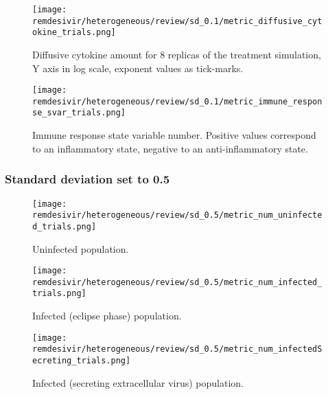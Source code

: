 \begin{figure}[H]
\texttt{[image: remdesivir/heterogeneous/review/sd\_0.1/metric\_diffusive\_cytokine\_trials.png]}
\caption{Diffusive cytokine amount for 8 replicas of the treatment simulation, Y axis in log scale, exponent values as tick-marks.\label{fig:app:hetero_other_sd:0.1:diff_cyto}}
\end{figure}


\begin{figure}[H]
\texttt{[image: remdesivir/heterogeneous/review/sd\_0.1/metric\_immune\_response\_svar\_trials.png]}
\caption{Immune response state variable number. Positive values correspond to an inflammatory state, negative to an anti-inflammatory state.\label{fig:app:hetero_other_sd:0.1:immune_var}}
\end{figure}



\subsubsection{Standard deviation set to 0.5}

\begin{figure}[H]
\texttt{[image: remdesivir/heterogeneous/review/sd\_0.5/metric\_num\_uninfected\_trials.png]}
\caption{Uninfected population.\label{fig:app:hetero_other_sd:0.5:uninf}}
\end{figure}

\begin{figure}[H]
\texttt{[image: remdesivir/heterogeneous/review/sd\_0.5/metric\_num\_infected\_trials.png]}
\caption{Infected (eclipse phase) population.\label{fig:app:hetero_other_sd:0.5:inf}}
\end{figure}

\begin{figure}[H]
\texttt{[image: remdesivir/heterogeneous/review/sd\_0.5/metric\_num\_infectedSecreting\_trials.png]}
\caption{Infected (secreting extracellular virus) population.\label{fig:app:hetero_other_sd:0.5:infSecr}}
\end{figure}

